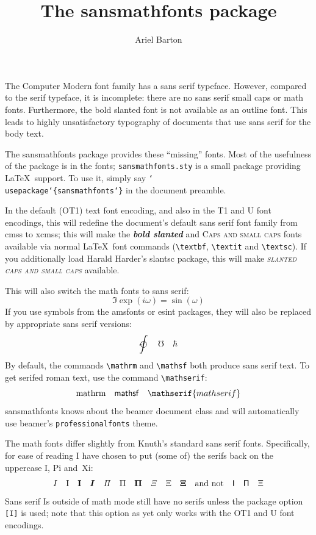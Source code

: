 \documentclass{amsart}
\title{The \textsf{sansmathfonts} package}
\author{Ariel Barton}
\begin{document}
\maketitle



The Computer Modern font family has a sans serif typeface. However, compared to the serif typeface, it is incomplete: there are no sans serif small caps or math fonts. Furthermore, the bold slanted font is not available as an outline font.
This leads to highly unsatisfactory typography of documents that use sans serif for the body text.


The \textsf{sansmathfonts} package provides these ``missing'' fonts. Most of the usefulness of the package is in the fonts; \texttt{sansmathfonts.sty} is a small package providing \LaTeX\ support. To use it, simply say \texttt{\char`\\usepackage\char`\{sansmathfonts\char`\}} in the document preamble.

In the default (OT1) text font encoding, and also in the T1 and U font encodings, this will redefine the document's default sans serif font family from \textsf{cmss} to \textsf{xcmss}; this will make the \textsf{\textbf{\textit{bold slanted}}} and \textsf{\textsc{Caps and small caps}} fonts available via normal \LaTeX\ font commands (\verb|\textbf|, \verb|\textit| and \verb|\textsc|). If you additionally load Harald Harder's \textsf{slantsc} package, this will make \textsf{\textit{\textsc{slanted caps and small caps}}} available.

This will also switch the math fonts to sans serif:
\[\Im \mathop{\mathrm{exp}}(i\omega)=\sin(\omega) \]
If you use symbols from the \textsf{amsfonts} or \textsf{esint} packages, they will also be replaced by appropriate sans serif versions:
\[\ointclockwise \quad \mho \quad \hbar\]
By default, the commands \verb|\mathrm| and \verb|\mathsf| both produce sans serif text. To get serifed roman text, use the command \verb|\mathserif|:
\[\mathrm{mathrm}\quad\mathsf{mathsf}\quad\mathserif{mathserif}\]
\textsf{sansmathfonts} knows about the \textsf{beamer} document class and will automatically use \textsf{beamer}'s \texttt{professionalfonts} theme.

The math fonts differ slightly from Knuth's standard sans serif fonts. Specifically, for ease of reading I have chosen to put (some of) the serifs back on the uppercase I, Pi and~Xi:
\[{I}\quad\mathrm{I}\quad\mathbf{I}\quad\bm{I}\quad
\mathit{\Pi}\quad{\Pi}\quad\mathbf{\Pi}\quad
\mathit{\Xi}\quad{\Xi}\quad\mathbf{\Xi}\quad
\text{and not\quad \textsf{\font \rawfont = cmss10 \rawfont I\quad \char5\quad\char4}}\]
\textsf{Sans serif Is outside of math mode} still have no serifs unless the package option \texttt{[I]} is used; note that this option as yet only works with the OT1 and U font encodings.
\end{document}
